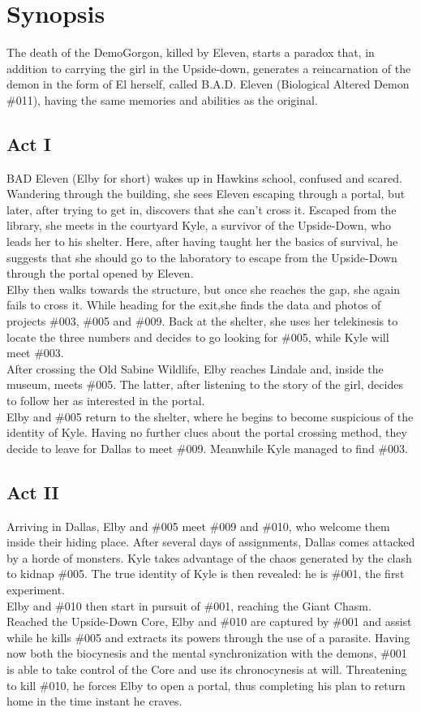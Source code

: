 \section{Synopsis}

The death of the DemoGorgon, killed by Eleven, starts a paradox that, in addition to carrying the girl in the Upside-down, generates a reincarnation of 
the demon in the form of El herself, called B.A.D. Eleven (Biological Altered Demon \#011), having the same memories and abilities as the original.

\subsection{Act I}
BAD Eleven (Elby for short) wakes up in Hawkins school, confused and scared. Wandering through the building, she sees Eleven escaping through a portal, but later, after trying to get in, discovers that she can't cross it. Escaped from the library, she meets in the courtyard Kyle, a survivor of the Upside-Down, who leads her to his shelter. Here, after having taught her the basics of survival, he suggests that she should go to the laboratory to escape from the Upside-Down through the portal opened by Eleven.\\
Elby then walks towards the structure, but once she reaches the gap, she again fails to cross it. While heading for the exit,she finds the data and photos of projects \#003, \#005 and \#009. Back at the shelter, she uses her telekinesis to locate the three numbers and decides to go looking for \#005, while Kyle will meet \#003.\\
After crossing the Old Sabine Wildlife, Elby reaches Lindale and, inside the museum, meets \#005. The latter, after listening to the story of the girl, decides to follow her as interested in the portal.\\
Elby and \#005 return to the shelter, where he begins to become suspicious of the identity of Kyle. Having no further clues about the portal 
crossing method, they decide to leave for Dallas to meet \#009. Meanwhile Kyle managed to find \#003.

\subsection{Act II}
Arriving in Dallas, Elby and \#005 meet \#009 and \#010, who welcome them inside their hiding place. After several days of assignments, Dallas comes
attacked by a horde of monsters. Kyle takes advantage of the chaos generated by the clash to kidnap \#005. The true identity of Kyle is then revealed: he is \#001, the first experiment.\\
Elby and \#010 then start in pursuit of \#001, reaching the Giant Chasm.\\
Reached the Upside-Down Core, Elby and \#010 are captured by \#001 and assist while he kills \#005 and extracts its powers through the use of a parasite.
Having now both the biocynesis and the mental synchronization with the demons, \#001 is able to take control of the Core and use its chronocynesis at will.
Threatening to kill \#010, he forces Elby to open a portal, thus completing his plan to return home in the time instant he craves.

